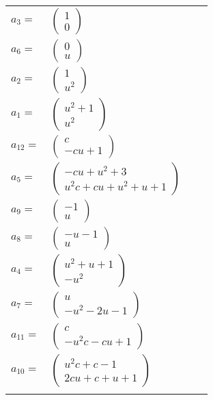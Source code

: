\documentclass[1p]{elsarticle_modified}
\theoremstyle{definition}
\begin{document}
\begin{tabular}{m{7pt} m{180pt} m{7pt} m{180pt} }
\flushright $a_{3}=$&$\begin{pmatrix}1\\0\end{pmatrix}$ \\
\flushright $a_{6}=$&$\begin{pmatrix}0\\u\end{pmatrix}$ \\
\flushright $a_{2}=$&$\begin{pmatrix}1\\u^2\end{pmatrix}$ \\
\flushright $a_{1}=$&$\begin{pmatrix}u^2+1\\u^2\end{pmatrix}$ \\
\flushright $a_{12}=$&$\begin{pmatrix}c\\- c u+1\end{pmatrix}$ \\
\flushright $a_{5}=$&$\begin{pmatrix}- c u+u^2+3\\u^2 c+c u+u^2+u+1\end{pmatrix}$ \\
\flushright $a_{9}=$&$\begin{pmatrix}-1\\u\end{pmatrix}$ \\
\flushright $a_{8}=$&$\begin{pmatrix}- u-1\\u\end{pmatrix}$ \\
\flushright $a_{4}=$&$\begin{pmatrix}u^2+u+1\\- u^2\end{pmatrix}$ \\
\flushright $a_{7}=$&$\begin{pmatrix}u\\- u^2-2 u-1\end{pmatrix}$ \\
\flushright $a_{11}=$&$\begin{pmatrix}c\\- u^2 c- c u+1\end{pmatrix}$ \\
\flushright $a_{10}=$&$\begin{pmatrix}u^2 c+c-1\\2 c u+c+u+1\end{pmatrix}$\\&\end{tabular}
\end{document}
